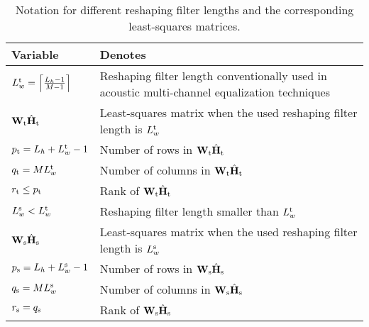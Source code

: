 \documentclass[twocolumn]{bmcart}%
\begin{document}
\begin{table*}[t!]
\begin{center}
  \caption{Notation for different reshaping filter lengths and the corresponding least-squares matrices.}
  \label{tbl: notation}
  \begin{tabularx}{\linewidth}{Xl}
    \toprule
    Variable & Denotes \\
    \midrule
    $L^{\rm t}_w = \left\lceil{\frac{L_h-1}{M-1}} \right\rceil$ & Reshaping filter length conventionally used in acoustic multi-channel equalization techniques\\
    $\mathbf{W}_{\rm t}\hat{\mathbf{H}}_{\rm t}$ & Least-squares matrix when the used reshaping filter length is $L^{\rm t}_w$ \\
    {$p_{\rm t} = L_h + L^{\rm t}_w - 1$} & Number of rows in $\mathbf{W}_{\rm t}\hat{\mathbf{H}}_{\rm t}$ \\
    $q_{\rm t} = M L^{\rm t}_w $ & Number of columns in $\mathbf{W}_{\rm t}\hat{\mathbf{H}}_{\rm t}$ \\
    {$r_{\rm t} \leq p_{\rm t}$} & Rank of $\mathbf{W}_{\rm t}\hat{\mathbf{H}}_{\rm t}$ \\
    \hline
    $L^{\rm s}_w < L^{\rm t}_w $ & Reshaping filter length smaller than $L^{\rm t}_w$ \\
    $\mathbf{W}_{\rm s}\hat{\mathbf{H}}_{\rm s}$ & Least-squares matrix when the used reshaping filter length is $L^{\rm s}_w$ \\
    {$p_{\rm s} = L_h + L^{\rm s}_w - 1$} & Number of rows in $\mathbf{W}_{\rm s}\hat{\mathbf{H}}_{\rm s}$ \\
    $q_{\rm s} = M L^{\rm s}_w $ & Number of columns in $\mathbf{W}_{\rm s}\hat{\mathbf{H}}_{\rm s}$ \\
    {$r_{\rm s} = q_{\rm s}$} & Rank of $\mathbf{W}_{\rm s}\hat{\mathbf{H}}_{\rm s}$ \\
    \bottomrule
  \end{tabularx}
\end{center}
\end{table*}
\end{document}
